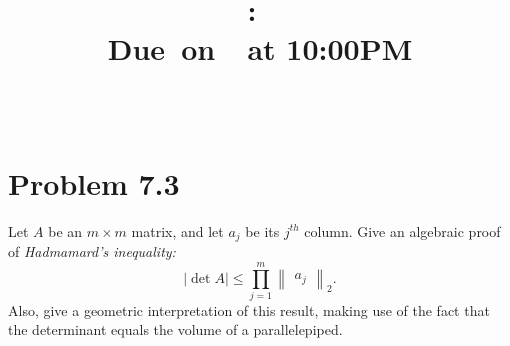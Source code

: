 \documentclass{article}
\title{
    \vspace{2in}
    \textmd{\textbf{\hmwkClass:\ \hmwkTitle}}\\
    \normalsize\vspace{0.1in}\small{Due\ on\ \hmwkDueDate\ at 10:00PM}\\
    \vspace{0.1in}\large{\textit{\hmwkClassInstructor\ \hmwkClassTime}}
    \vspace{3in}
}
\author{\hmwkAuthorName}
\date{}
\begin{document}
\maketitle

\pagebreak
\section*{Problem 7.3}
Let $A$ be an $m \times m$ matrix, and let $a_j$ be its $j^{th}$ column. Give an algebraic proof of \textit{Hadmamard's inequality:} \[ \lvert \det A \rvert \leq \prod_{j=1}^m \begin{Vmatrix}
    a_j
\end{Vmatrix}_2. \]
Also, give a geometric interpretation of this result, making use of the fact that the determinant equals the volume of a parallelepiped. 
\end{document}
